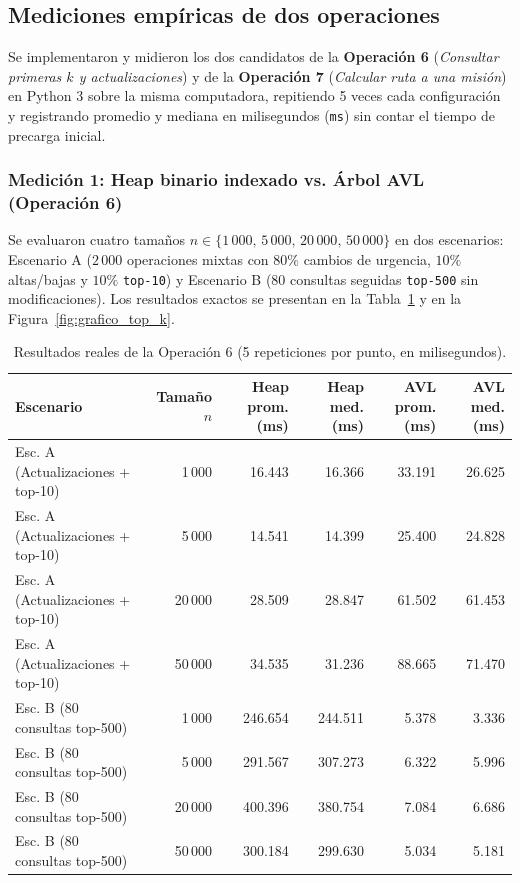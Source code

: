 \documentclass[11pt,a4paper]{article}
\begin{document}
\subsection{Mediciones empíricas de dos operaciones}

Se implementaron y midieron los dos candidatos de la \textbf{Operación 6} (\textit{Consultar primeras $k$ y actualizaciones}) y de la \textbf{Operación 7} (\textit{Calcular ruta a una misión}) en Python 3 sobre la misma computadora, repitiendo 5 veces cada configuración y registrando promedio y mediana en milisegundos (\texttt{ms}) sin contar el tiempo de precarga inicial.

\subsubsection{Medición 1: Heap binario indexado vs. Árbol AVL (Operación 6)}

Se evaluaron cuatro tamaños $n \in \{1\,000,\, 5\,000,\, 20\,000,\, 50\,000\}$ en dos escenarios: Escenario A ($2\,000$ operaciones mixtas con $80\%$ cambios de urgencia, $10\%$ altas/bajas y $10\%$ \texttt{top-10}) y Escenario B ($80$ consultas seguidas \texttt{top-500} sin modificaciones). Los resultados exactos se presentan en la Tabla~\ref{tab:medicion_top_k} y en la Figura~\ref{fig:grafico_top_k}.

\begin{table}[htbp]
\centering
\caption{Resultados reales de la Operación 6 (5 repeticiones por punto, en milisegundos).}
\label{tab:medicion_top_k}
\small
\begin{tabular}{l r r r r r}
\toprule
\textbf{Escenario} & \textbf{Tamaño $n$} & \textbf{Heap prom. (ms)} & \textbf{Heap med. (ms)} & \textbf{AVL prom. (ms)} & \textbf{AVL med. (ms)} \\
\midrule
Esc. A (Actualizaciones + top-10) & 1\,000  & 16.443  & 16.366  & 33.191 & 26.625 \\
Esc. A (Actualizaciones + top-10) & 5\,000  & 14.541  & 14.399  & 25.400 & 24.828 \\
Esc. A (Actualizaciones + top-10) & 20\,000 & 28.509  & 28.847  & 61.502 & 61.453 \\
Esc. A (Actualizaciones + top-10) & 50\,000 & 34.535  & 31.236  & 88.665 & 71.470 \\
\midrule
Esc. B (80 consultas top-500)     & 1\,000  & 246.654 & 244.511 & 5.378  & 3.336  \\
Esc. B (80 consultas top-500)     & 5\,000  & 291.567 & 307.273 & 6.322  & 5.996  \\
Esc. B (80 consultas top-500)     & 20\,000 & 400.396 & 380.754 & 7.084  & 6.686  \\
Esc. B (80 consultas top-500)     & 50\,000 & 300.184 & 299.630 & 5.034  & 5.181  \\
\bottomrule
\end{tabular}
\end{table}
\end{document}
